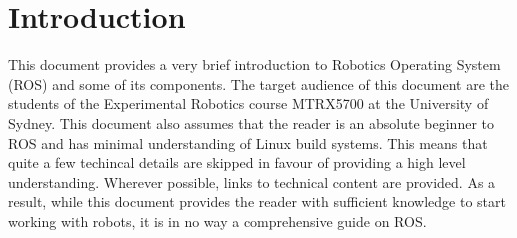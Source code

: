\chapter[Introduction]{Introduction}
This document provides a very brief introduction to Robotics Operating System (ROS) and some of its components.
The target audience of this document are the students of the Experimental Robotics course MTRX5700 at the University of Sydney.
This document also assumes that the reader is an absolute beginner to ROS and has minimal understanding of Linux build systems.
This means that quite a few techincal details are skipped in favour of providing a high level understanding. 
Wherever possible, links to technical content are provided.
As a result, while this document provides the reader with sufficient knowledge to start working with robots, it is in no way a comprehensive guide on ROS.
